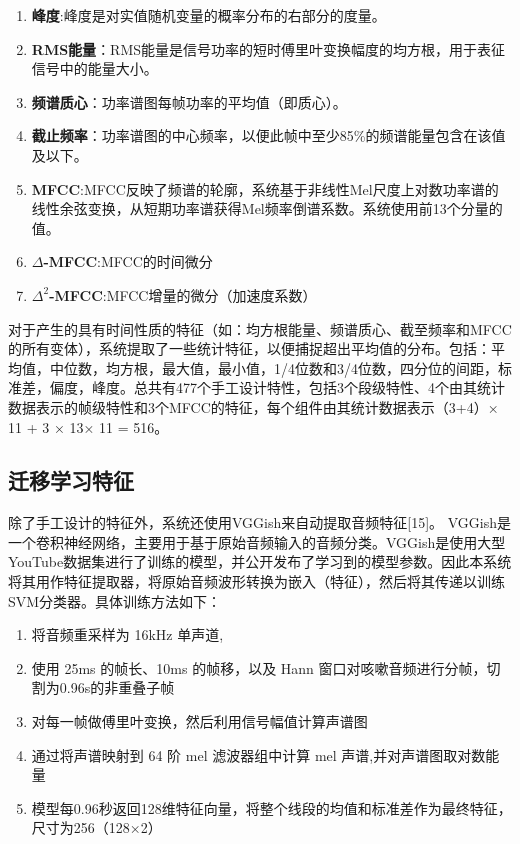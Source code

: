 \begin{enumerate}
    \item
    \textbf{峰度}:峰度是对实值随机变量的概率分布的右部分的度量。
    \item
    \textbf{RMS能量}：RMS能量是信号功率的短时傅里叶变换幅度的均方根，用于表征信号中的能量大小。
    \item
    \textbf{频谱质心}：功率谱图每帧功率的平均值（即质心）。
    \item
    \textbf{截止频率}：功率谱图的中心频率，以便此帧中至少85\%的频谱能量包含在该值及以下。
    \item
    \textbf{MFCC}:MFCC反映了频谱的轮廓，系统基于非线性Mel尺度上对数功率谱的线性余弦变换，从短期功率谱获得Mel频率倒谱系数。系统使用前13个分量的值。
    \item
    \textbf{\(\Delta\)-MFCC}:MFCC的时间微分
    \item
    \textbf{\(\Delta^2\)-MFCC}:MFCC增量的微分（加速度系数）
\end{enumerate}

对于产生的具有时间性质的特征（如：均方根能量、频谱质心、截至频率和MFCC的所有变体），系统提取了一些统计特征，以便捕捉超出平均值的分布。包括：平均值，中位数，均方根，最大值，最小值，1/4位数和3/4位数，四分位的间距，标准差，偏度，峰度。总共有477个手工设计特性，包括3个段级特性、4个由其统计数据表示的帧级特性和3个MFCC的特征，每个组件由其统计数据表示（3+4）× 11 + 3 × 13× 11 = 516。
\subsection{迁移学习特征}
除了手工设计的特征外，系统还使用VGGish来自动提取音频特征[15]。
VGGish是一个卷积神经网络，主要用于基于原始音频输入的音频分类。VGGish是使用大型YouTube数据集进行了训练的模型，并公开发布了学习到的模型参数。因此本系统将其用作特征提取器，将原始音频波形转换为嵌入（特征），然后将其传递以训练SVM分类器。具体训练方法如下：
\begin{enumerate}
    \item 将音频重采样为 16kHz 单声道,
    \item 使用 25ms 的帧长、10ms 的帧移，以及 Hann 窗口对咳嗽音频进行分帧，切割为0.96s的非重叠子帧
    \item 对每一帧做傅里叶变换，然后利用信号幅值计算声谱图
    \item 通过将声谱映射到 64 阶 mel 滤波器组中计算 mel 声谱,并对声谱图取对数能量
    \item 模型每0.96秒返回128维特征向量，将整个线段的均值和标准差作为最终特征，尺寸为256（128×2）
\end{enumerate}

